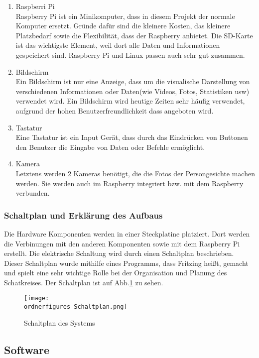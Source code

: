 \begin{enumerate}
	\item Raspberri Pi \\
Raspberry Pi ist ein Minikomputer, dass in diesem Projekt der normale Komputer ersetzt. Gründe dafür sind die kleinere Kosten, das kleinere Platzbedarf sowie die Flexibilität, dass der Raspberry anbietet. Die SD-Karte ist das wichtigste Element, weil dort alle Daten und Informationen gespeichert sind. Raspberry Pi und Linux passen auch sehr gut zusammen.
	\item Bildschirm \\
Ein Bildschirm ist nur eine Anzeige, dass um die visualische Darstellung von verschiedenen Informationen oder Daten(wie Videos, Fotos, Statistiken usw) verwendet wird. Ein Bildschirm wird heutige Zeiten sehr häufig verwendet, aufgrund der hohen Benutzerfreundlichkeit dass angeboten wird.
	\item Tastatur \\
Eine Tastatur ist ein Input Gerät, dass durch das Eindrücken von Buttonen den Benutzer die Eingabe von Daten oder Befehle ermöglicht.
	\item Kamera \\
Letztens werden 2 Kameras benötigt, die die Fotos der Persongesichte machen werden. Sie werden auch im Raspberry integriert bzw. mit dem Raspberry verbunden.
\end{enumerate}
		\subsubsection{Schaltplan und Erklärung des Aufbaus}
Die Hardware Komponenten werden in einer Steckplatine platziert. Dort werden die Verbinungen mit den anderen Komponenten sowie mit dem Raspberry Pi erstellt. Die elektrische Schaltung wird durch einen Schaltplan beschrieben. Dieser Schaltplan wurde mithilfe eines Programms, dass Fritzing heißt, gemacht und spielt eine sehr wichtige Rolle bei der Organisation und Planung des Schatkreises. Der Schaltplan ist auf Abb.\ref{fig:Schaltplan} zu sehen.
\begin{figure}[htp]
	\texttt{[image: \\ordnerfigures Schaltplan.png]}
	\caption{Schaltplan des Systems}
	\label{fig:Schaltplan}
\end{figure}
	\subsection{Software}
